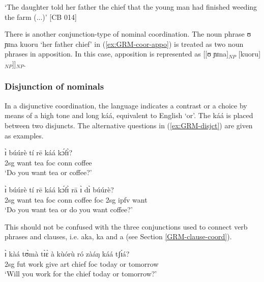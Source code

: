 \begin{exe}
\begin{exe}
\begin{exe}
\begin{exe}
\begin{exe}
\begin{exe}
\begin{exe}
\begin{exe}
\begin{exe}
\begin{exe}
\begin{exe}
 \glt  `The daughter told her father the chief that the young
man had finished weeding the farm (...)' [CB 014]
\z


There is another conjunction-type of nominal coordination. The noun phrase 
{\sls 
ʊ ɲɪna kuoru} `her father chief'  in (\ref{ex:GRM-coor-appo}) is treated as two
noun phrases in apposition. In this case, apposition is represented as [[ʊ
ɲɪna]$_{NP}$ [kuoru]$_{NP}$]]$_{NP}$.


\subsubsection{Disjunction of nominals}
\label{sec:GRM-disjunct-nom}

In a disjunctive coordination, the language indicates a
contrast or a choice by means of a high tone and long {\sls káá}, 
equivalent
to 
English `or'. 
The  {\sls káá}  is  placed between  two disjuncts. The alternative questions in 
(\ref{ex:GRM-disjct}) are given as examples.

\ea\label{ex:GRM-disjct}
\ea\label{ex:GRM-disjct-1}

\gll ɪ̀ búúrè tí rē káá kɔ́fɪ̀?\\
  {\sc 2sg} want tea {\sc foc} {\sc conn} coffee\\
\glt  `Do you want tea or coffee?' 

\ex\label{ex:GRM-disjct-2}

\gll ɪ̀ búúrè tí rē káá kɔ́fɪ̀ rā ɪ̀ dɪ̀ búúrè?\\
  {\sc 2sg} want tea {\sc foc} {\sc conn} coffee {\sc foc} {\sc 2sg}
{\sc ipfv} want\\
\glt  `Do you want tea or do you want coffee?' 

\z 
 \z



This  
 should not be confused with the three conjunctions used to connect verb
phrases and clauses, i.e. {\sls aka}, {\sls ka} and {\sls a} (see Section
\ref{GRM-clause-coord}).   



\ea\label{ex:GRM-dij-vp4.5}

\gll ɪ̀ kàá tʊ̀mà tɪ̀ɛ̀ à kùórù ró zàáŋ káá tʃɪ́á?\\
  {\sc 2sg} {\sc fut} work give {\sc art} chief  {\sc foc} today or
tomorrow\\
\glt  `Will you work for the chief today or tomorrow?' 
\z




\end{exe}
\end{exe}
\end{exe}
\end{exe}
\end{exe}
\end{exe}
\end{exe}
\end{exe}
\end{exe}
\end{exe}
\end{exe}
